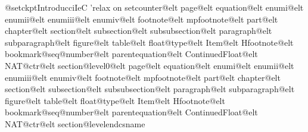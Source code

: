 \relax 
\providecommand\hyper@newdestlabel[2]{}
^^@@setckpt{Introducci^^@IeC {^^@'^^@relax o}n}{
^^@setcounter{^^@@elt {page}^^@@elt {equation}^^@@elt {enumi}^^@@elt {enumii}^^@@elt {enumiii}^^@@elt {enumiv}^^@@elt {footnote}^^@@elt {mpfootnote}^^@@elt {part}^^@@elt {chapter}^^@@elt {section}^^@@elt {subsection}^^@@elt {subsubsection}^^@@elt {paragraph}^^@@elt {subparagraph}^^@@elt {figure}^^@@elt {table}^^@@elt {float@type}^^@@elt {Item}^^@@elt {Hfootnote}^^@@elt {bookmark@seq@number}^^@@elt {parentequation}^^@@elt {ContinuedFloat}^^@@elt {NAT@ctr}^^@@elt {section@level}}{0^^@@elt {page}^^@@elt {equation}^^@@elt {enumi}^^@@elt {enumii}^^@@elt {enumiii}^^@@elt {enumiv}^^@@elt {footnote}^^@@elt {mpfootnote}^^@@elt {part}^^@@elt {chapter}^^@@elt {section}^^@@elt {subsection}^^@@elt {subsubsection}^^@@elt {paragraph}^^@@elt {subparagraph}^^@@elt {figure}^^@@elt {table}^^@@elt {float@type}^^@@elt {Item}^^@@elt {Hfootnote}^^@@elt {bookmark@seq@number}^^@@elt {parentequation}^^@@elt {ContinuedFloat}^^@@elt {NAT@ctr}^^@@elt {section@level}^^@endcsname }
}
